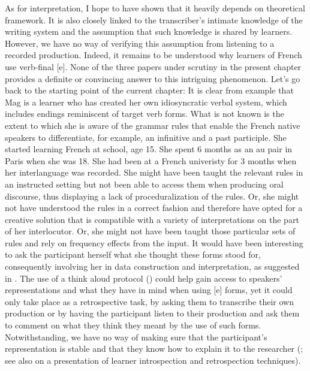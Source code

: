 \documentclass[output=paper,colorlinks,citecolor=brown,modfonts,nonflat]{../langscibook}
\begin{document}
As for interpretation, I hope to have shown that it heavily depends on theoretical framework. It is also closely linked to the transcriber’s intimate knowledge of the writing system and the assumption that such knowledge is shared by learners. However, we have no way of verifying this assumption from listening to a recorded production. Indeed, it remains to be understood why learners of French use verb-final [e]. None of the three papers under scrutiny in the present chapter provides a definite or convincing answer to this intriguing phenomenon. Let’s go back to the starting point of the current chapter: It is clear from example  that Mag is a learner who has created her own idiosyncratic verbal system, which includes endings reminiscent of target verb forms. What is not known is the extent to which she is aware of the grammar rules that enable the French native speakers to differentiate, for example, an infinitive and a past participle. She started learning French at school, age 15. She spent 6 months as an au pair in Paris when she was 18. She had been at a French univeristy for 3 months when her interlanguage was recorded. She might have been taught the relevant rules in an instructed setting but not been able to access them when producing oral discourse, thus displaying a lack of proceduralization of the rules. Or, she might not have understood the rules in a correct fashion and therefore have opted for a creative solution that is compatible with a variety of interpretations on the part of her interlocutor. Or, she might not have been taught those particular sets of rules and rely on frequency effects from the input. It would have been interesting to ask the participant herself what she thought these forms stood for, consequently involving her in data construction and interpretation, as suggested in \citet{Revesz2012}. The use of a think aloud protocol (\citealt{LeowMorgan-Short2004}) could help gain access to speakers’ representations and what they have in mind when using [e] forms, yet it could only take place as a retrospective task, by asking them to transcribe their own production or by having the participant listen to their production and ask them to comment on what they think they meant by the use of such forms. Notwithstanding, we have no way of making sure that the participant’s representation is stable and that they know how to explain it to the researcher (\citealt{NorrisOrtega2012}; see also \citealt{GassMackey2000} on a presentation of learner introspection and retrospection techniques).
\end{document}
